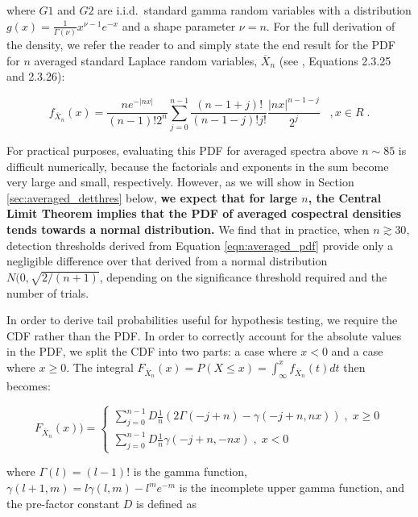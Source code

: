 \documentclass[12pt]{emulateapj}
\begin{document}
\noindent where $G1$ and $G2$ are i.i.d.\ standard gamma random variables with a distribution $g(x) = \frac{1}{\Gamma(\nu)} x^{\nu-1} e^{-x}$ and a shape parameter $\nu = n$. For the full derivation of the density, we refer the reader to \citet{kotz2001} and simply state the end result for the PDF for $n$ averaged standard Laplace random variables, $\overline{X}_n$ (see \citealt{kotz2001}, Equations 2.3.25 and 2.3.26):

\begin{equation}
f_{\overline{X}_n}(x) = \frac{n e^{-|nx|}}{(n-1)! 2^n} \sum_{j=0}^{n-1} \frac{(n-1+j)!}{(n-1-j)! j!} \frac{|nx|^{n-1-j}}{2^j} \; \;\;, x \in R \; .
\label{eqn:averaged_pdf}
\end{equation}

For practical purposes, evaluating this PDF for averaged spectra above $n\sim 85$ is difficult numerically, because the factorials and exponents in the sum become very large and small, respectively. However, as we will show in Section \ref{sec:averaged_detthres} below, \textbf{we expect that for large $n$, the Central Limit Theorem implies that the PDF of averaged cospectral densities tends towards a normal distribution.} We find that in practice, when $n \gtrsim 30$, detection thresholds derived from Equation \ref{eqn:averaged_pdf} provide only a negligible difference over that derived from a normal distribution $N(0, \sqrt{2/(n+1)}$, depending on the significance threshold required and the number of trials. 

In order to derive tail probabilities useful for hypothesis testing, we require the CDF rather than the PDF. In order to correctly account for the absolute values in the PDF, we split the CDF into two parts: a case where $x < 0$ and a case where $x \geq 0$. The integral $F_{\overline{X}_n}(x) = P ( X \leq x) = \int_{\infty}^{x} f_{\overline{X}_n}(t) dt$ then becomes:

\begin{equation}
\label{eqn:averaged_cdf}
F_{\overline{X}_n}(x)) = 
  \begin{cases} 
   \sum_{j=0}^{n-1} D \frac{1}{n}(2\Gamma(-j+n) - \gamma(-j+n, nx)) \;, \;x \geq 0 \\
     \sum_{j=0}^{n-1} D  \frac{1}{n}\gamma(-j+n, -nx) \;,\; x < 0
  \end{cases}
\end{equation}

\noindent where $\Gamma(l)= (l-1)!$ is the gamma function, $\gamma(l+1, m) = l\gamma(l,m) - l^m e^{-m}$ is the incomplete upper gamma function, and the pre-factor constant $D$ is defined as 
\end{document}

